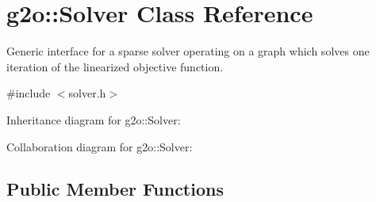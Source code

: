 \hypertarget{classg2o_1_1Solver}{}\section{g2o\+:\+:Solver Class Reference}
\label{classg2o_1_1Solver}


Generic interface for a sparse solver operating on a graph which solves one iteration of the linearized objective function.  




{\ttfamily \#include $<$solver.\+h$>$}



Inheritance diagram for g2o\+:\+:Solver\+:


Collaboration diagram for g2o\+:\+:Solver\+:
\subsection*{Public Member Functions}
